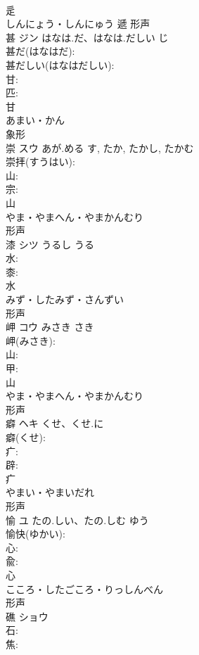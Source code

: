 \documentclass[8pt]{extreport}
\begin{document}
\begin{CJK}{UTF8}{min}
\\	辵	
\\	しんにょう・しんにゅう	遞	形声 
\\	甚	ジン	はなは.だ、はなは.だしい	じ	
\\	甚だ(はなはだ): 
\\	甚だしい(はなはだしい): 
\\	甘: 
\\	匹: 
\\	甘	
\\	あまい・かん	
\\	象形 
\\	崇	スウ	あが.める	す, たか, たかし, たかむ	
\\	崇拝(すうはい): 
\\	山: 
\\	宗: 
\\	山	
\\	やま・やまへん・やまかんむり	
\\	形声 
\\	漆	シツ	うるし	うる	
\\	水: 
\\	桼: 
\\	水	
\\	みず・したみず・さんずい	
\\	形声 
\\	岬	コウ	みさき	さき	
\\	岬(みさき): 
\\	山: 
\\	甲: 
\\	山	
\\	やま・やまへん・やまかんむり	
\\	形声 
\\	癖	ヘキ	くせ、くせ.に		
\\	癖(くせ): 
\\	疒: 
\\	辟: 
\\	疒	
\\	やまい・やまいだれ	
\\	形声 
\\	愉	ユ	たの.しい、たの.しむ	ゆう	
\\	愉快(ゆかい): 
\\	心: 
\\	兪: 
\\	心	
\\	こころ・したごころ・りっしんべん	
\\	形声 
\\	礁	ショウ			
\\	石: 
\\	焦: 

\end{CJK}
\end{document}
